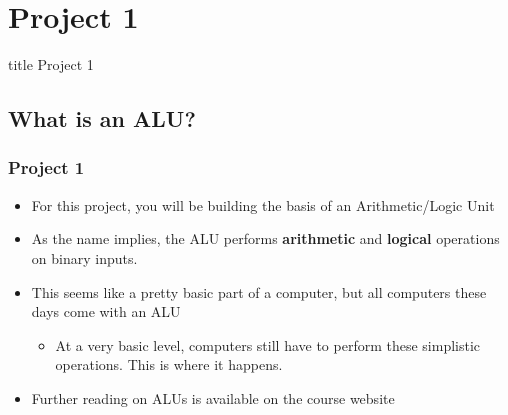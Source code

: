 \documentclass{beamer}
\begin{document}
   	\section{Project 1}
   		
   		\begin{frame}
                \vfill
                \centering
                \begin{beamercolorbox}[sep=8pt,center,shadow=true,rounded=true]{title}
                    Project 1\par%
                \end{beamercolorbox}
                \vfill
             \end{frame}
             
        \subsection{What is an ALU?}
             
      	\begin{frame}
      		\frametitle{Project 1}
      		\begin{itemize}
      			\item For this project, you will be building the basis of an Arithmetic/Logic Unit
      			\item As the name implies, the ALU performs \textbf{arithmetic} and \textbf{logical} operations on binary inputs.
      			\item This seems like a pretty basic part of a computer, but all computers these days come with an ALU
      			\begin{itemize}
      				\item At a very basic level, computers still have to perform these simplistic operations. This is where it happens.
      			\end{itemize}
      			\item Further reading on ALUs is available on the course website
      		\end{itemize}
      	\end{frame}
      	
\end{document}
